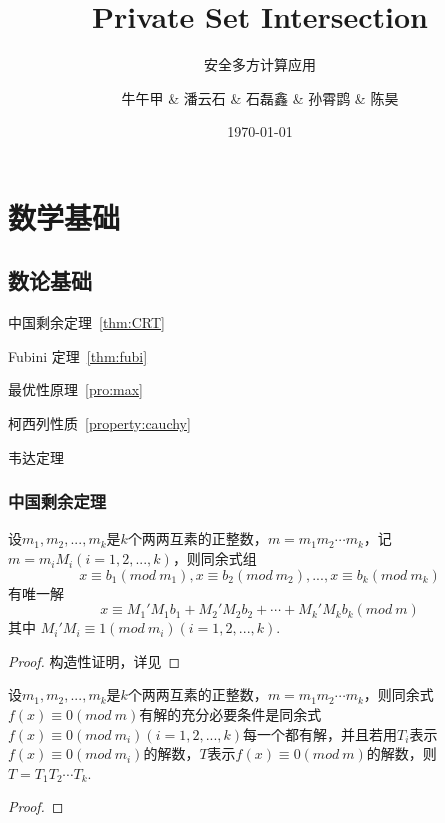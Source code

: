 \documentclass[lang=cn,newtx,10pt,scheme=chinese]{elegantbook}
\title{Private Set Intersection}
\subtitle{安全多方计算应用}
\author{牛午甲 \& 潘云石 \& 石磊鑫 \& 孙霄鹍 \& 陈昊}
\institute{USTC}
\date{\today}
\begin{document}
	
\maketitle
\frontmatter

\tableofcontents

\mainmatter
\setcounter{chapter}{-1}
\chapter{数学基础}
\section{数论基础}
\begin{introduction}
	\item 中国剩余定理~\ref{thm:CRT}
	\item Fubini 定理~\ref{thm:fubi}
	\item 最优性原理~\ref{pro:max}
	\item 柯西列性质~\ref{property:cauchy}
	\item 韦达定理
\end{introduction}
\subsection{中国剩余定理}
\begin{theorem}\label{thm:CRT}
	设$m_1, m_2,...,m_k$是$k$个两两互素的正整数，$m=m_1m_2\cdots m_k$，记$m=m_iM_i(i=1,2,...,k)$，则同余式组$$x\equiv b_1(mod\ m_1),x\equiv b_2(mod\ m_2),...,x\equiv b_k(mod\ m_k)$$
	有唯一解$$x\equiv M_1'M_1b_1+M_2'M_2b_2+\cdots+M_k'M_kb_k(mod\ m)$$
	其中 $M_i'M_i\equiv 1(mod\ m_i)(i=1,2,...,k)$.
\end{theorem}
\begin{proof}
	构造性证明，详见\printbibliography[heading=bibintoc, title=\ebibname]
\end{proof}

\begin{corollary}\label{thm:EX_CRT}
	设$m_1, m_2,...,m_k$是$k$个两两互素的正整数，$m=m_1m_2\cdots m_k$，则同余式$f(x)\equiv 0(mod\ m)$有解的充分必要条件是同余式$f(x)\equiv 0(mod\ m_i)(i=1,2,...,k)$每一个都有解，并且若用$T_i$表示$f(x)\equiv 0(mod\ m_i)$的解数，$T$表示$f(x)\equiv 0(mod\ m)$的解数，则$T=T_1T_2\cdots T_k$.
\end{corollary}
\begin{proof}
	
\end{proof}
\end{document}

